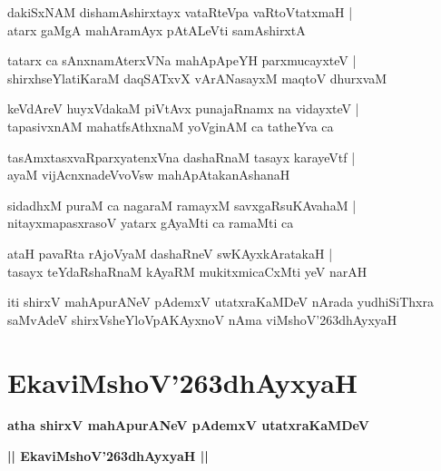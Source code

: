 \documentclass[twoside,12pt,openright]{book}
\def\S{\char'263}
\newcounter{shloka}[chapter]
\begin{document}
\begin{shloka}%
dakiSxNAM dishamAshirxtayx vataRteVpa vaRtoVtatxmaH |\\
atarx gaMgA mahAramAyx pAtALeVti samAshirxtA 
\end{shloka}

\begin{shloka}%
tatarx ca sAnxnamAterxVNa mahApApeYH parxmucayxteV |\\
shirxhseYlatiKaraM daqSATxvX vArANasayxM maqtoV dhurxvaM 
\end{shloka}

\begin{shloka}%
keVdAreV huyxVdakaM piVtAvx punajaRnamx na vidayxteV |\\
tapasivxnAM mahatfsAthxnaM yoVginAM ca tatheYva ca 
\end{shloka}

\begin{shloka}%
tasAmxtasxvaRparxyatenxVna dashaRnaM tasayx karayeVtf |\\
ayaM vijAcnxnadeVvoVsw mahApAtakanAshanaH 
\end{shloka}

\begin{shloka}%
sidadhxM puraM ca nagaraM ramayxM savxgaRsuKAvahaM |\\
nitayxmapasxrasoV yatarx gAyaMti ca ramaMti ca 
\end{shloka}

\begin{shloka}%
ataH pavaRta rAjoVyaM dashaRneV swKAyxkAratakaH |\\
tasayx teYdaRshaRnaM kAyaRM mukitxmicaCxMti yeV narAH 
\end{shloka}

\begin{center}
iti shirxV mahApurANeV pAdemxV utatxraKaMDeV  nArada yudhiSiThxra saMvAdeV   
shirxVsheYloVpAKAyxnoV nAma viMshoV\S dhAyxyaH 
\end{center}

\chapter{EkaviMshoV\S dhAyxyaH}

\begin{center}
{\LARGE\bfseries atha shirxV mahApurANeV pAdemxV utatxraKaMDeV} 
\end{center}

\begin{center}
{\LARGE\bfseries  || EkaviMshoV\S dhAyxyaH ||}
\end{center}
\end{document}

